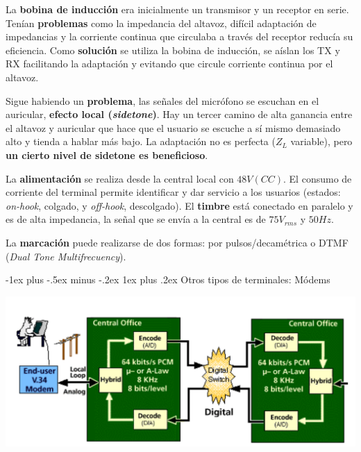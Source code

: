 \documentclass[10pt,portrait, twocolumn]{article}
\makeatletter
\renewcommand{\subsubsection}{\@startsection{subsubsection}{3}{0mm}%
                                {-1ex plus -.5ex minus -.2ex}%
                                {1ex plus .2ex}%
                                {\normalfont\small\bfseries}}
\makeatother
\begin{document}
La \textbf{bobina de inducción} era inicialmente un transmisor y un receptor en serie. Tenían \textbf{problemas} como la impedancia del altavoz, difícil adaptación de impedancias y la corriente continua que circulaba a través del receptor reducía su eficiencia. Como \textbf{solución} se utiliza la bobina de inducción, se aíslan los TX y RX facilitando la adaptación y evitando que circule corriente continua por el altavoz.


Sigue habiendo un \textbf{problema}, las señales del micrófono se escuchan en el auricular, \textbf{efecto local (\textit{sidetone})}. Hay un tercer camino de alta ganancia entre el altavoz y auricular que hace que el usuario se escuche a sí mismo demasiado alto y tienda a hablar más bajo. La adaptación no es perfecta ($Z_{L}$ variable), pero \textbf{un cierto nivel de sidetone es beneficioso}.


La \textbf{alimentación} se realiza desde la central local con $48V (CC)$. El consumo de corriente del terminal permite identificar y dar servicio a los usuarios (estados: \textit{on-hook}, colgado, y \textit{off-hook}, descolgado). El \textbf{timbre} está conectado en paralelo y es de alta impedancia, la señal que se envía a la central es de $75 V_{rms}$ y $50Hz$. 


La \textbf{marcación} puede realizarse de dos formas: por pulsos/decamétrica o DTMF (\textit{Dual Tone Multifrecuency}).

\subsubsection{Otros tipos de terminales: Módems}

	\begin{center}
		\includegraphics[scale=0.2]{images/SpecsModem}
	\end{center}
\end{document}
